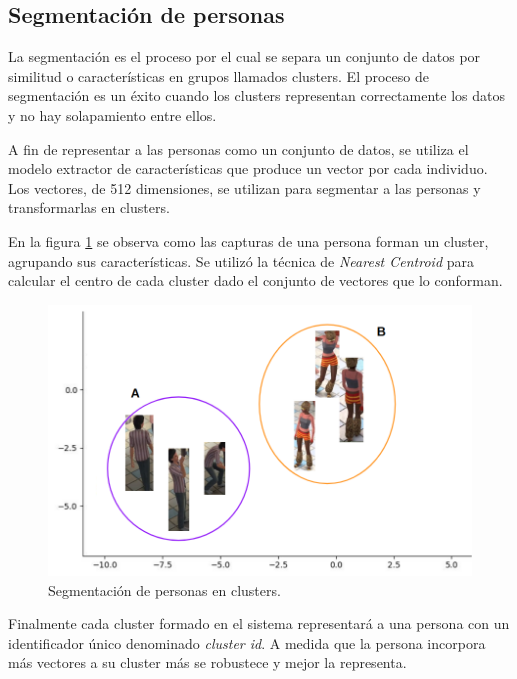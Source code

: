 \subsection{Segmentación de personas}

La segmentación es el proceso por el cual se separa un conjunto de datos por similitud o características en grupos llamados clusters. El proceso de segmentación es un éxito cuando los clusters representan correctamente los datos y no hay solapamiento entre ellos.

A fin de representar a las personas como un conjunto de datos, se utiliza el modelo extractor de características que produce un vector por cada individuo. Los vectores, de 512 dimensiones, se utilizan para segmentar a las personas y transformarlas en clusters.

En la figura \ref{fig:clusterPersonas} se observa como las capturas de una persona forman un cluster, agrupando sus características. Se utilizó la técnica de \textit{Nearest Centroid} \citep{NEAREST_CENTROID} para calcular el centro de cada cluster dado el conjunto de vectores que lo conforman.

\begin{figure}[ht]
	\centering
	\includegraphics[scale=.6]{./Figures/clusterPersonas.png}
	\caption{Segmentación de personas en clusters.}
	\label{fig:clusterPersonas}
\end{figure}

Finalmente cada cluster formado en el sistema representará a una persona con un identificador único denominado \textit{cluster id}. A medida que la persona incorpora más vectores a su cluster más se robustece y mejor la representa.

\newpage

